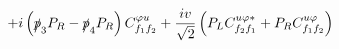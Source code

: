 %
\begin{dmath*}
%
  +  i \left(\slashed{p}_{3} P_R - \slashed{p}_{4} P_R\right) C^{ \varphi  u}_{f_1 f_2}  +  \frac{i v}{\sqrt{2}} \left(P_L C^{u \varphi  *}_{f_2 f_1} + P_R C^{u \varphi  }_{f_1 f_2}\right)
%
\end{dmath*}
%
